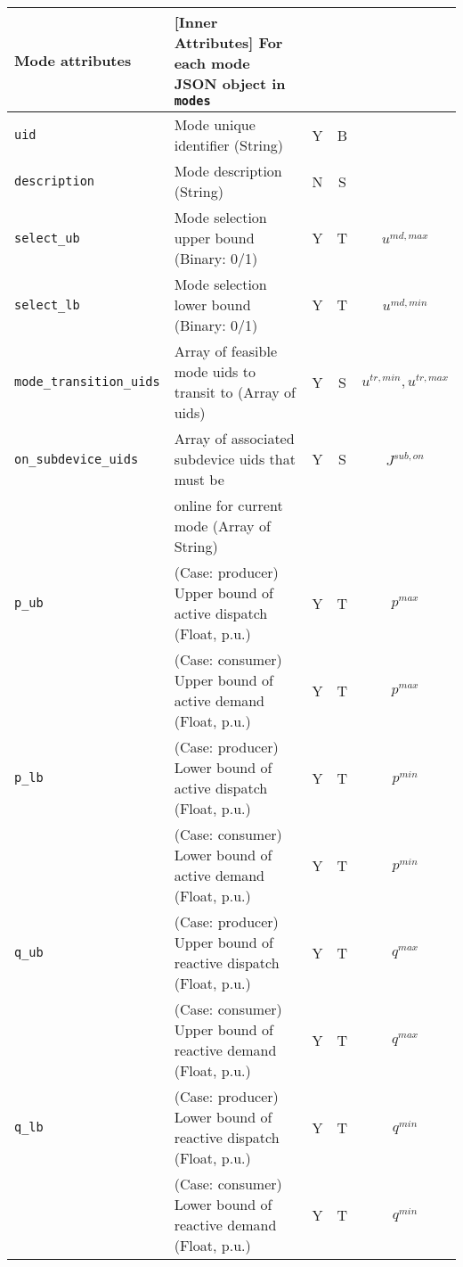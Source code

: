 \documentclass{article}
\begin{document}
\begin{center}
\small
\begin{tabular}{ l | l | c | c | c |}
  \hline 
  Mode attributes & [Inner Attributes] For each mode JSON object in {\tt modes} &  &  & \\
  \hline    
  {\tt uid} & Mode unique identifier (String) & Y & B &  \\
  {\tt description} & Mode description (String) & N & S &  \\
  {\tt select\_ub} & Mode selection upper bound (Binary: 0/1) & Y & T & $u^{md,max}$\\
  {\tt select\_lb} & Mode selection lower bound (Binary: 0/1) & Y & T & $u^{md,min}$\\
  {\tt mode\_transition\_uids} & Array of feasible mode uids to transit to (Array of uids) & Y & S & $u^{tr,min}, u^{tr,max}$\\
  {\tt on\_subdevice\_uids} & Array of associated subdevice uids that must be & Y & S & $J^{sub,on}$\\
                            &  online for current mode (Array of String) &   &  & \\
  {\tt p\_ub} & {\color{red} (Case: producer) Upper bound of active dispatch (Float, p.u.)   }& Y & T & $p^{max}$ \\
              & {\color{red} (Case: consumer) Upper bound of active demand   (Float, p.u.)   }& Y & T & $p^{max}$ \\
  {\tt p\_lb} & {\color{red} (Case: producer) Lower bound of active dispatch (Float, p.u.)   }& Y & T & $p^{min}$ \\
              & {\color{red} (Case: consumer) Lower bound of active demand   (Float, p.u.)   }& Y & T & $p^{min}$ \\
  {\tt q\_ub} & {\color{red} (Case: producer) Upper bound of reactive dispatch (Float, p.u.) }& Y & T & $q^{max}$\\
              & {\color{red} (Case: consumer) Upper bound of reactive demand   (Float, p.u.) }& Y & T & $q^{max}$\\
  {\tt q\_lb} & {\color{red} (Case: producer) Lower bound of reactive dispatch (Float, p.u.) }& Y & T & $q^{min}$\\ 
              & {\color{red} (Case: consumer) Lower bound of reactive demand   (Float, p.u.) }& Y & T & $q^{min}$\\ 


\end{tabular}
\end{center}
\end{document}
